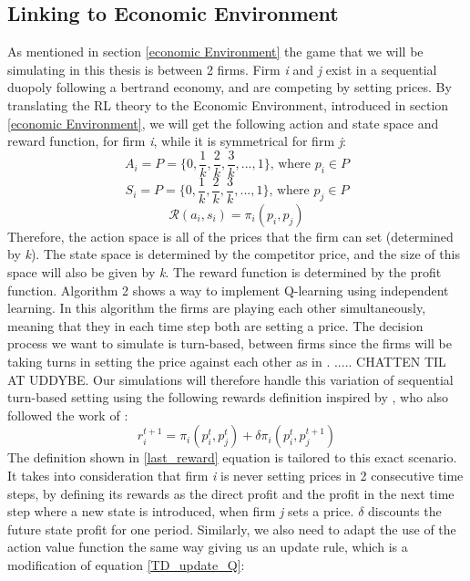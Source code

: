 \documentclass{article}
\begin{document}
\subsection{Linking to Economic Environment}
\label{siste Q teori afsnit}
As mentioned in section \ref{economic Environment} the game that we will be simulating in this thesis is between 2 firms. Firm \textit{i} and \textit{j} exist in a sequential duopoly following a bertrand economy, and are competing by setting prices.
By translating the RL theory to the Economic Environment, introduced in section \ref{economic Environment}, we will get the following action and state space and reward function, for firm \textit{i}, while it is symmetrical for firm \textit{j}:
$$A_i = P = \{0, \frac{1}{k}, \frac{2}{k}, \frac{3}{k},...,1\} \text{,  where }p_i\in P$$
$$S_i=P=\{0, \frac{1}{k}, \frac{2}{k}, \frac{3}{k},...,1\} \text{,  where }p_j\in P$$ 
$$\mathcal{R}(a_i,s_i) = \pi_i(p_i,p_j)$$
Therefore, the action space is all of the prices that the firm can set (determined by \textit{k}). The state space is determined by the competitor price, and the size of this space will also be given by \textit{k}. The reward function is determined by the profit function.
\newline
Algorithm 2 shows a way to implement Q-learning using independent learning. In this algorithm the firms are playing each other simultaneously, meaning that they in each time step both are setting a price. 
The decision process we want to simulate is turn-based, between firms since the firms will be taking turns in setting the price against each other as in \cite{Klein2021}. ..... CHATTEN TIL AT UDDYBE.
\newline 
Our simulations will therefore handle this variation of sequential turn-based setting using the following rewards definition inspired by \cite{Julius2023}, who also followed the work of \cite{Klein2021}: 
\begin{equation}
\label{last_reward}
    r_i^{t+1} = \pi_i(p^t_i,p^t_j) + \delta\pi_i(p_i^t,p_j^{t+1})
\end{equation}
The definition shown in \ref{last_reward} equation is tailored to this exact scenario. It takes into consideration that firm \textit{i} is never setting prices in 2 consecutive time steps, by defining its rewards as the direct profit and the profit in the next time step where a new state is introduced, when firm \textit{j} sets a price. $\delta$ discounts the future state profit for one period. Similarly, we also need to adapt the use of the action value function the same way giving us an update rule, which is a modification of equation \ref{TD_update_Q}:
\end{document}
